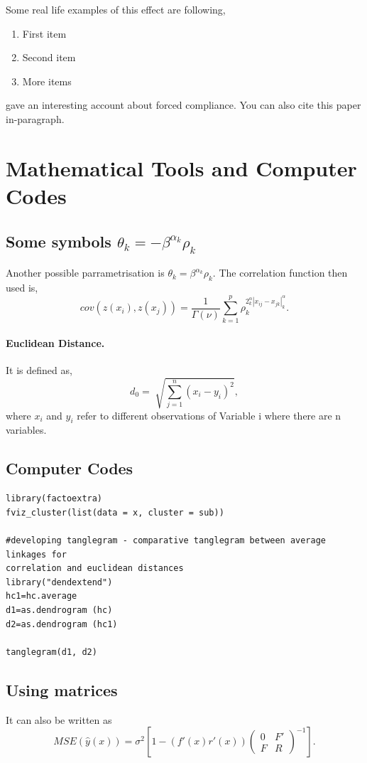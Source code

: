 \documentclass[a4paper,english,12pt]{paper}
\begin{document}
\blindtext

Some real life examples of this effect are following, 

\begin{enumerate}
    \item First item
    \item Second item
    \item More items
\end{enumerate}



\cite{fest1959} gave an interesting account about forced compliance. You can also cite this paper in-paragraph. \citep{fest1959} 


\section{Mathematical Tools and Computer Codes}
\subsection{Some symbols $\theta_k = - \beta^{\alpha_k} \rho_k$}
Another possible parrametrisation is $\theta_k = \beta^{\alpha_k} \rho_k$. The correlation function then used is,
$$
cov(z(x_i),z(x_j)) = \frac{1}{\Gamma(\nu)} \sum_{k=1}^{p} \rho_k^{2^\alpha_k |x_{ij} - x_{jk}|^\alpha_k}.
$$

\paragraph{Euclidean Distance.} It is defined as,
$$
d_0 = \sqrt[]{\sum_{j=1}^n (x_i - y_i)^2},
$$
where $x_i$ and $y_i$ refer to different observations of Variable i where there are n variables.

\subsection{Computer Codes}
\begin{verbatim}
library(factoextra)
fviz_cluster(list(data = x, cluster = sub))

#developing tanglegram - comparative tanglegram between average linkages for 
correlation and euclidean distances
library("dendextend")
hc1=hc.average 
d1=as.dendrogram (hc)
d2=as.dendrogram (hc1)

tanglegram(d1, d2)
\end{verbatim}

\subsection{Using matrices}
It can also be written as 
$$
MSE(\hat{y}(x)) = \sigma^2 \left[ 1-(f'(x)r'(x)) \left( 
\begin{array}{cc}
    0 & F' \\
    F & R
\end{array}
\right)^{-1} \right].
$$
\end{document}
